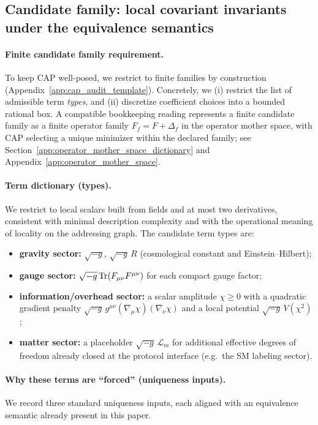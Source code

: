 \subsection{Candidate family: local covariant invariants under the equivalence semantics}
\label{subsec:cap_action_candidate_family}

\paragraph{Finite candidate family requirement.}
\AuditTag To keep CAP well-posed, we restrict to finite families by construction (Appendix~\ref{app:cap_audit_template}).
Concretely, we (i) restrict the list of admissible term \emph{types}, and (ii) discretize coefficient choices into a bounded rational box.
\AuditTag A compatible bookkeeping reading represents a finite candidate family as a finite operator family $F_f=F+\Delta_f$ in the operator mother space, with CAP selecting a unique minimizer within the declared family; see Section~\ref{app:operator_mother_space_dictionary} and Appendix~\ref{app:operator_mother_space}.

\paragraph{Term dictionary (types).}
\InterfaceTag We restrict to local scalars built from fields and at most two derivatives, consistent with minimal description complexity and with the operational meaning of locality on the addressing graph.
The candidate term types are:
\begin{itemize}
\item \textbf{gravity sector:} $\sqrt{-g}$, $\sqrt{-g}\,R$ (cosmological constant and Einstein--Hilbert);
\item \textbf{gauge sector:} $\sqrt{-g}\,\mathrm{Tr}(F_{\mu\nu}F^{\mu\nu})$ for each compact gauge factor;
\item \textbf{information/overhead sector:} a scalar amplitude $\chi\ge 0$ with a quadratic gradient penalty $\sqrt{-g}\,g^{\mu\nu}(\nabla_\mu\chi)(\nabla_\nu\chi)$ and a local potential $\sqrt{-g}\,V(\chi^2)$;
\item \textbf{matter sector:} a placeholder $\sqrt{-g}\,\mathcal{L}_m$ for additional effective degrees of freedom already closed at the protocol interface (e.g.\ the SM labeling sector).
\end{itemize}

\paragraph{Why these terms are ``forced'' (uniqueness inputs).}
We record three standard uniqueness inputs, each aligned with an equivalence semantic already present in this paper.

